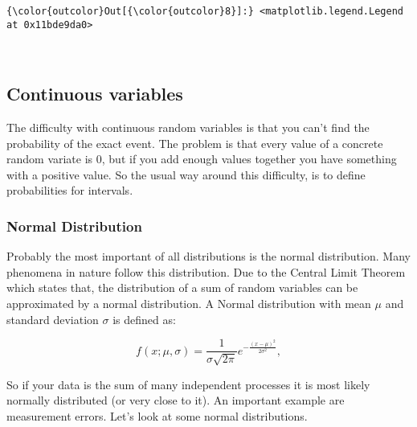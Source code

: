\documentclass[11pt]{article}
\begin{document}
\begin{Verbatim}[commandchars=\\\{\}]
{\color{outcolor}Out[{\color{outcolor}8}]:} <matplotlib.legend.Legend at 0x11bde9da0>
\end{Verbatim}
            
    \begin{center}
    \end{center}
    { \hspace*{\fill} \\}
    
    \subsection{Continuous variables}\label{continuous-variables}

The difficulty with continuous random variables is that you can't find
the probability of the exact event. The problem is that every value of a
concrete random variate is \(0\), but if you add enough values together
you have something with a positive value. So the usual way around this
difficulty, is to define probabilities for intervals.

    \subsubsection{Normal Distribution}\label{normal-distribution}

Probably the most important of all distributions is the normal
distribution. Many phenomena in nature follow this distribution. Due to
the Central Limit Theorem which states that, the distribution of a sum
of random variables can be approximated by a normal distribution. A
Normal distribution with mean \(\mu\) and standard deviation \(\sigma\)
is defined as:

\[ f(x; \mu, \sigma) = \frac{1}{\sigma\sqrt{2\pi}} e^{ -\frac{(x-\mu)^2}{2\sigma^2} }, \]

So if your data is the sum of many independent processes it is most
likely normally distributed (or very close to it). An important example
are measurement errors. Let's look at some normal distributions.
\end{document}
